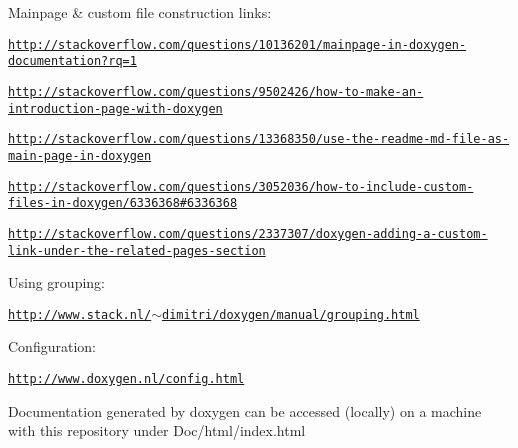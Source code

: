Mainpage \& custom file construction links\+:
\begin{DoxyItemize}
\item \href{http://stackoverflow.com/questions/10136201/mainpage-in-doxygen-documentation?rq=1}{\tt http\+://stackoverflow.\+com/questions/10136201/mainpage-\/in-\/doxygen-\/documentation?rq=1}
\item \href{http://stackoverflow.com/questions/9502426/how-to-make-an-introduction-page-with-doxygen}{\tt http\+://stackoverflow.\+com/questions/9502426/how-\/to-\/make-\/an-\/introduction-\/page-\/with-\/doxygen}
\item \href{http://stackoverflow.com/questions/13368350/use-the-readme-md-file-as-main-page-in-doxygen}{\tt http\+://stackoverflow.\+com/questions/13368350/use-\/the-\/readme-\/md-\/file-\/as-\/main-\/page-\/in-\/doxygen}
\item \href{http://stackoverflow.com/questions/3052036/how-to-include-custom-files-in-doxygen/6336368#6336368}{\tt http\+://stackoverflow.\+com/questions/3052036/how-\/to-\/include-\/custom-\/files-\/in-\/doxygen/6336368\#6336368}
\item \href{http://stackoverflow.com/questions/2337307/doxygen-adding-a-custom-link-under-the-related-pages-section}{\tt http\+://stackoverflow.\+com/questions/2337307/doxygen-\/adding-\/a-\/custom-\/link-\/under-\/the-\/related-\/pages-\/section}
\end{DoxyItemize}

Using grouping\+:
\begin{DoxyItemize}
\item \href{http://www.stack.nl/~dimitri/doxygen/manual/grouping.html}{\tt http\+://www.\+stack.\+nl/$\sim$dimitri/doxygen/manual/grouping.\+html}
\end{DoxyItemize}

Configuration\+:
\begin{DoxyItemize}
\item \href{http://www.doxygen.nl/config.html}{\tt http\+://www.\+doxygen.\+nl/config.\+html}
\end{DoxyItemize}

Documentation generated by doxygen can be accessed (locally) on a machine with this repository under Doc/html/index.\+html 